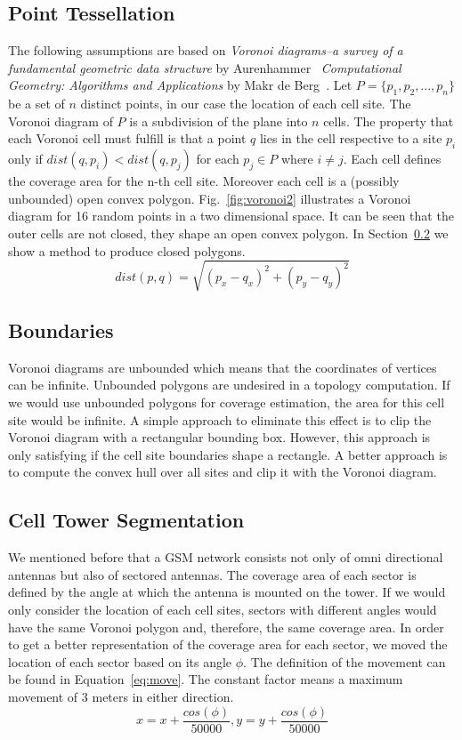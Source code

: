 \documentclass[master,english]{hgbthesis}
\begin{document}
\subsection{Point Tessellation}
The following assumptions are based on \emph{Voronoi diagrams--a survey of a fundamental geometric data structure} by Aurenhammer~\cite{Aurenhammer1991} \emph{Computational Geometry: Algorithms and Applications} by Makr de Berg~\cite{Berg2000}.
Let $P=\{p_1,p_2,...,p_n\}$ be a set of $n$ distinct points, in our case the location of each cell site. The Voronoi diagram of $P$ is a subdivision of the plane into $n$ cells. The property that each Voronoi cell must fulfill is that a point $q$ lies in the cell respective to a site $p_i$ only if $dist\left(q,p_i\right) < dist\left(q,p_j\right)$ for each $p_j \in P$ where $i \neq j$. Each cell defines the coverage area for the n-th cell site. Moreover each cell is a (possibly unbounded) open convex polygon. Fig.\ \ref{fig:voronoi2} illustrates a Voronoi diagram for 16 random points in a two dimensional space. It can be seen that the outer cells are not closed, they shape an open convex polygon. In Section~\ref{sec:boundaries} we show a method to produce closed polygons.
\begin{equation}
	dist(p,q)=\sqrt{\left(p_x-q_x\right)^2+\left(p_y-q_y\right)^2}
\end{equation}
\subsection{Boundaries}
\label{sec:boundaries}
Voronoi diagrams are unbounded which means that the coordinates of vertices can be infinite. Unbounded polygons are undesired in a topology computation. If we would use unbounded polygons for coverage estimation, the area for this cell site would be infinite. A simple approach to eliminate this effect is to clip the Voronoi diagram with a rectangular bounding box. However, this approach is only satisfying if the cell site boundaries shape a rectangle. A better approach is to compute the convex hull over all sites and clip it with the Voronoi diagram.
\subsection{Cell Tower Segmentation}
We mentioned before that a GSM network consists not only of omni directional antennas but also of sectored antennas. The coverage area of each sector is defined by the angle at which the antenna is mounted on the tower. If we would only consider the location of each cell sites, sectors with different angles would have the same Voronoi polygon and, therefore, the same coverage area. In order to get a better representation of the coverage area for each sector, we moved the location of each sector based on its angle $\phi$. The definition of the movement can be found in Equation~\ref{eq:move}. The constant factor means a maximum movement of 3 meters in either direction.
\begin{equation}
	\label{eq:move}
	x=x+\frac{cos(\phi)}{50000},y=y+\frac{cos(\phi)}{50000}
\end{equation}%
\end{document}
